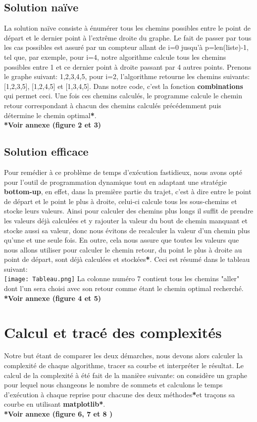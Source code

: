 \documentclass[12pt, openany]{report}
\begin{document}
\setlength{\parindent}{1cm}\subsection{Solution naïve}
La solution naïve consiste à énumérer tous les chemins possibles entre le point de départ et le dernier point à l'extrême droite du graphe. Le fait de passer par tous les cas possibles est assuré par un compteur allant de i=0 jusqu'à p=len(liste)-1, tel que, par exemple, pour i=4, notre algorithme calcule tous les chemins possibles entre 1 et ce dernier point à droite passant par 4 autres points. Prenons le graphe suivant:
{1,2,3,4,5}, pour i=2, l'algorithme retourne les chemins suivants: [1,2,3,5], [1,2,4,5] et [1,3,4,5]. Dans notre code, c'est la fonction \textbf{combinations} qui permet ceci.
Une fois ces chemins calculés, le programme calcule le chemin retour correspondant à chacun des chemins calculés précédemment puis détermine le chemin optimal\textbf{*}. \\
\textbf{*Voir annexe (figure 2 et 3)}
\setlength{\parindent}{1cm}\subsection{Solution efficace}
Pour remédier à ce problème de temps d'exécution fastidieux, nous avons opté pour l'outil de programmation dynamique tout en adaptant une stratégie \textbf{bottom-up}, en effet, dans la première partie du trajet, c'est à dire entre le point de départ et le point le plus à droite, celui-ci calcule tous les sous-chemins et stocke leurs valeurs. Ainsi pour calculer des chemins plus longs il suffit de prendre les valeurs déjà calculées et y rajouter la valeur du bout de chemin manquant et stocke aussi sa valeur, donc nous évitons de recalculer la valeur d'un chemin plus qu'une et une seule fois. En outre, cela nous assure que toutes les valeurs que nous allons utiliser pour calculer le chemin retour, du point le plus à droite au point de départ, sont déjà calculées et stockées\textbf{*}. 
Ceci est résumé dans le tableau suivant: \\
\texttt{[image: Tableau.png]} 
La colonne numéro 7 contient tous les chemins "aller" dont l'un sera choisi avec son retour comme étant le chemin optimal recherché. \\
\textbf{*Voir annexe (figure 4 et 5)}
\section{Calcul et tracé des complexités}
Notre but étant de comparer les deux démarches, nous devons alors calculer la complexité de chaque algorithme, tracer sa courbe et interpréter le résultat. Le calcul de la complexité à été fait de la manière suivante: on considère un graphe pour lequel nous changeons le nombre de sommets et calculons le temps d'exécution à chaque reprise pour chacune des deux méthodes\textbf{*}et traçons sa courbe en utilisant \textbf{matplotlib}\textbf{*}. \\
\textbf{*Voir annexe (figure 6, 7 et 8 )}
	
\end{document}
